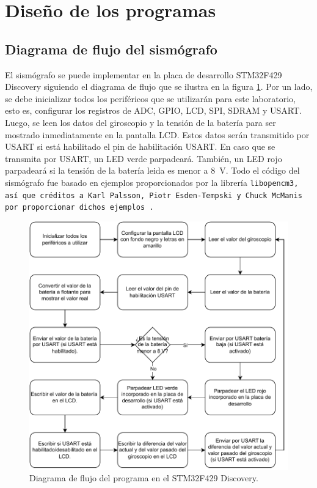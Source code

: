 \section{Diseño de los programas}
\subsection{Diagrama de flujo del sismógrafo}
El sismógrafo se puede implementar en la placa de desarrollo STM32F429 Discovery siguiendo el diagrama de flujo que se ilustra en la figura \ref{fsm}. Por un lado, se debe inicializar todos los periféricos que se utilizarán para este laboratorio, esto es, configurar los registros de ADC, GPIO, LCD, SPI, SDRAM y USART. Luego, se leen los datos del giroscopio y la tensión de la batería para ser mostrado inmediatamente en la pantalla LCD. Estos datos serán transmitido por USART si está habilitado el pin de habilitación USART. En caso que se transmita por USART, un LED verde parpadeará. También, un LED rojo parpadeará si la tensión de la batería leida es menor a \SI{8}{\volt}. Todo el código del sismógrafo fue basado en ejemplos proporcionados por la librería \tt{libopencm3}, así que créditos a Karl
Palsson, Piotr Esden-Tempski y Chuck McManis por proporcionar dichos ejemplos \cite{libopencm3}.
\begin{figure}[H]
    \centering
    \includegraphics[width=14cm]{Imagenes/fsm.pdf}
    \caption{Diagrama de flujo del programa en el STM32F429 Discovery.}
    \label{fsm}
\end{figure}

